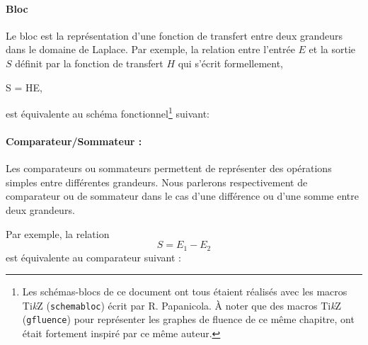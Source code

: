 \newpage
\paragraph{Bloc}

Le bloc est la représentation d'une fonction de transfert entre deux 
grandeurs dans le domaine de Laplace. Par exemple, la relation entre l'entrée 
$E$ et la sortie $S$ définit par la fonction de transfert $H$ qui s'écrit 
formellement, 
\begin{bequation}
S = HE,\label{eq-ES}
\end{bequation}
est équivalente au schéma fonctionnel\footnote{Les schémas-blocs de ce document
ont tous étaient réalisés avec les macros Ti\emph{k}Z (\verb?schemabloc?) 
écrit par R. Papanicola\cite{schemabloc}. \`A noter que des macros 
Ti\emph{k}Z (\verb?gfluence?) pour représenter les graphes de fluence 
de ce même chapitre, ont était fortement inspiré par ce même auteur.} 
suivant:

\begin{center}
\end{center}

\paragraph{Comparateur/Sommateur :}

Les comparateurs ou sommateurs permettent de représenter des opérations 
simples entre différentes grandeurs.
Nous parlerons respectivement de comparateur ou de sommateur dans le cas 
d'une différence ou d'une somme entre deux grandeurs. 


Par exemple, la relation 
$$
S = E_1-E_2 
$$
est équivalente au comparateur suivant :
\begin{center}
\end{center}

